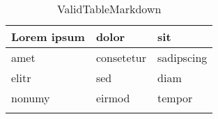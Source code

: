 ﻿\begin{longtable}[l]{|l|l|l|}
\hline
      Lorem ipsum 
    & dolor 
    & sit \\ \hline
      amet 
    & consetetur 
    & sadipscing \\ \hline
      elitr 
    & sed 
    & diam \\ \hline
      nonumy 
    & eirmod 
    & tempor \\ \hline
\caption{ValidTableMarkdown}
\label{tab:validtablemarkdown}
\end{longtable}
